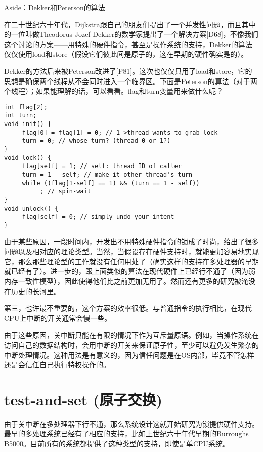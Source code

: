 \begin{tcolorbox}[colframe=grey,colback= grey,arc=0pt,left=6pt,right=6pt,top=6pt,bottom=6pt,boxsep=0pt]
\begin{center}Aside：Dekker和Peterson的算法\end{center}
在二十世纪六十年代，Dijkstra跟自己的朋友们提出了一个并发性问题，而且其中的一位叫做Theodorus Jozef Dekker的数学家提出了一个解决方案[D68]，不像我们这个讨论的方案——用特殊的硬件指令，甚至是操作系统的支持，Dekker的算法仅仅使用load和store（假设它们彼此间是原子的，这在早期的硬件确实是的）。

Dekker的方法后来被Peterson改进了[P81]。这次也仅仅只用了load和store，它的思想是确保两个线程从不会同时进入一个临界区。下面是Peterson的算法（对于两个线程）；如果能理解的话，可以看看。flag和turn变量用来做什么呢？
\begin{verbatim}
int flag[2];
int turn;
void init() {
     flag[0] = flag[1] = 0; // 1->thread wants to grab lock
     turn = 0; // whose turn? (thread 0 or 1?)
}
void lock() {
     flag[self] = 1; // self: thread ID of caller
     turn = 1 - self; // make it other thread’s turn
     while ((flag[1-self] == 1) && (turn == 1 - self))
          ; // spin-wait
}
void unlock() {
     flag[self] = 0; // simply undo your intent
}
\end{verbatim}

由于某些原因，一段时间内，开发出不用特殊硬件指令的锁成了时尚，给出了很多问题以及相对应的理论类型。当然，当假设存在硬件支持时，就能更加容易地实现它，那么那些理论型的工作就没有任何用处了（确实这样的支持在多处理器的早期就已经有了）。进一步的，跟上面类似的算法在现代硬件上已经行不通了（因为弱内存一致性模型），因此使得他们比之前更加无用了。然而还有更多的研究被淹没在历史的长河里。
\end{tcolorbox}


第三，也许最不重要的，这个方案的效率很低。与普通指令的执行相比，在现代CPU上中断的开关通常会慢一些。

由于这些原因，关中断只能在有限的情况下作为互斥量原语。例如，当操作系统在访问自己的数据结构时，会用中断的开关来保证原子性，至少可以避免发生繁杂的中断处理情况。这种用法是有意义的，因为信任问题是在OS内部，毕竟不管怎样还是会信任自己执行特权操作的。

\section{test-and-set (原子交换)}

由于关中断在多处理器下行不通，那么系统设计这就开始研究为锁提供硬件支持。最早的多处理系统已经有了相应的支持，比如上世纪六十年代早期的Burroughs B5000。目前所有的系统都提供了这种类型的支持，即使是单CPU系统。

